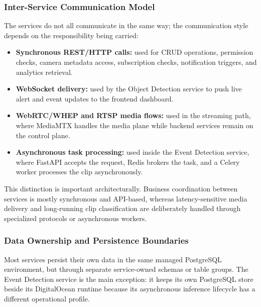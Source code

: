 \documentclass[12pt,a4paper,oneside]{report}
\begin{document}
\subsubsection{Inter-Service Communication Model}
\hspace{0.8cm}The services do not all communicate in the same way; the communication style depends on the responsibility being carried:
\begin{itemize}
  \item \textbf{Synchronous REST/HTTP calls:} used for CRUD operations, permission checks, camera metadata access, subscription checks, notification triggers, and analytics retrieval.
  \item \textbf{WebSocket delivery:} used by the Object Detection service to push live alert and event updates to the frontend dashboard.
  \item \textbf{WebRTC/WHEP and RTSP media flows:} used in the streaming path, where MediaMTX handles the media plane while backend services remain on the control plane.
  \item \textbf{Asynchronous task processing:} used inside the Event Detection service, where FastAPI accepts the request, Redis brokers the task, and a Celery worker processes the clip asynchronously.
\end{itemize}

\hspace{0.8cm}This distinction is important architecturally. Business coordination between services is mostly synchronous and API-based, whereas latency-sensitive media delivery and long-running clip classification are deliberately handled through specialized protocols or asynchronous workers.

\subsubsection{Data Ownership and Persistence Boundaries}
\hspace{0.8cm}Most services persist their own data in the same managed PostgreSQL environment, but through separate service-owned schemas or table groups. The Event Detection service is the main exception: it keeps its own PostgreSQL store beside its DigitalOcean runtime because its asynchronous inference lifecycle has a different operational profile.
\end{document}
